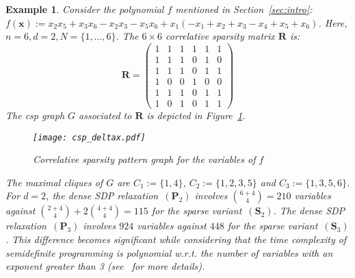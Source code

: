 \documentclass[preprint,fleqn,nocopyrightspace]{sigplanconf}
\newcommand{\x}{\mathbf{x}}
\def\P{\mathbf{P}}
\def\S{\mathbf{S}}
\def\S{\mathbf{S}}
\theoremstyle{plain}
\newtheorem{example}{Example}
\begin{document}
\begin{example}
\label{ex:sparse}
Consider the polynomial $f$ mentioned in Section~\ref{sec:intro}:
$f(\x) := x_2 x_5 + x_3 x_6 - x_2 x_3  - x_5 x_6 
+ x_1 ( - x_1 +  x_2 +  x_3  - x_4 +  x_5 +  x_6)$.
%
Here, $n = 6, d = 2, N = \{1,\dots, 6 \}$. The $6 \times 6$ correlative sparsity matrix $\mathbf{R}$ is:
\[
\mathbf{R} = 
\begin{pmatrix}
  1 & 1 & 1 & 1 & 1 & 1 \\
  1 & 1 & 1 & 0 & 1 & 0 \\
  1 & 1 & 1 & 0 & 1 & 1 \\
  1 & 0 & 0 & 1 & 0 & 0 \\
  1 & 1 & 1 & 0 & 1 & 1 \\
  1 & 0 & 1 & 0 & 1 & 1 
 \end{pmatrix}
\]
The csp graph $G$ associated to $\mathbf{R}$ is depicted in Figure~\ref{fig:csp_deltax}. 
%
\begin{figure}[!ht]	
\begin{center}
\texttt{[image: csp\_deltax.pdf]}
\caption{Correlative sparsity pattern graph for the variables of $f$}
\label{fig:csp_deltax}
\end{center}
\end{figure}
%
The maximal cliques of $G$ are $C_1 := \{1, 4\}$, $C_2 := \{1, 2, 3, 5\}$ and $C_3 := \{1, 3, 5, 6\}$. For $d=2$, the dense SDP relaxation~$(\P_2)$ involves $\binom{6 + 4}{4} = 210$ variables against $\binom{2 + 4}{4} + 2 \binom{4 + 4}{4} = 115$ for the sparse variant~$(\S_2)$. The dense SDP relaxation~$(\P_3)$ involves $924$ variables against $448$ for the sparse variant~$(\S_3)$. 
This difference becomes significant while considering that the time complexity of semidefinite programming is polynomial w.r.t. the number of variables with an exponent greater than 3 (see~\cite[Chapter 4]{BenTal01} for more details).
\end{example}
%
\end{document}

